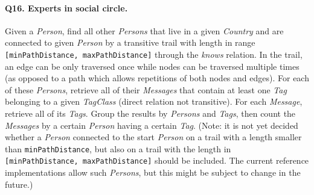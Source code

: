 \paragraph{\textbf{Q16}. Experts in social circle.}
Given a \emph{Person}, find all other \emph{Persons} that live in a
given \emph{Country} and are connected to given \emph{Person} by a
transitive trail with length in range
\texttt{{[}minPathDistance,\ maxPathDistance{]}} through the
\emph{knows} relation.
In the trail, an edge can be only traversed once while nodes can be
traversed multiple times (as opposed to a path which allows repetitions
of both nodes and edges).
For each of these \emph{Persons}, retrieve all of their \emph{Messages}
that contain at least one \emph{Tag} belonging to a given
\emph{TagClass} (direct relation not transitive). For each
\emph{Message}, retrieve all of its \emph{Tags}.
Group the results by \emph{Persons} and \emph{Tags}, then count the
\emph{Messages} by a certain \emph{Person} having a certain \emph{Tag}.
(Note: it is not yet decided whether a \emph{Person} connected to the
start \emph{Person} on a trail with a length smaller than
\texttt{minPathDistance}, but also on a trail with the length in
\texttt{{[}minPathDistance,\ maxPathDistance{]}} should be included. The
current reference implementations allow such \emph{Persons}, but this
might be subject to change in the future.)
